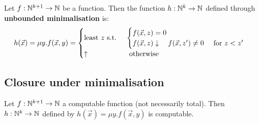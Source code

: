 \begin{definition}
  Let $f : \mathbb{N}^{k+1}\rightarrow\mathbb{N}$ be a function. Then the function
  $h:\mathbb{N}^k\rightarrow\mathbb{N}$ defined through \textbf{unbounded
    minimalisation} is:
  \begin{equation*}
    h(\vec{x}) = \mu y. f(\vec{x},y) = \begin{cases}
      $least $ z$ s.t. $ & \begin{cases}
        f(\vec{x},z) = 0 \\
        f(\vec{x},z)\downarrow \quad f(\vec{x},z') \not= 0 \quad $ for $ z<z'
      \end{cases} \\
      \uparrow           & $ otherwise $
    \end{cases}
  \end{equation*}
\end{definition}

\subsection{Closure under minimalisation}

\begin{theorem}
  Let $f:\mathbb{N}^{k+1}\rightarrow\mathbb{N}$ a computable function (not necessarily total). Then $h:\mathbb{N}^k\rightarrow\mathbb{N}$ defined by $h(\vec{x}) = \mu y. f(\vec{x},y)$ is computable.
\end{theorem}

